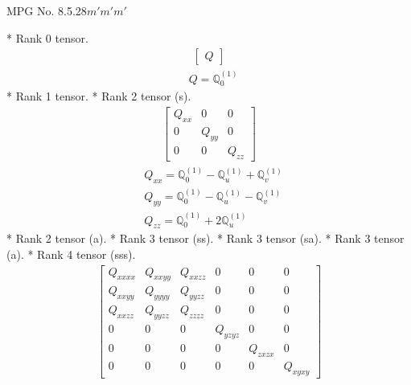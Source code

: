 \documentclass[fleqn,8pt,landscape]{jsarticle}
\begin{document}
\setcounter{MaxMatrixCols}{32}

\renewcommand{\tablename}{Table~}
\renewcommand{\figurename}{Figure~}
\begin{center}
\LARGE
MPG No. 8.5.28\quad$m'm'm'$
\end{center}
* Rank 0 tensor.
\begin{align*}
\begin{bmatrix} Q \end{bmatrix}
\end{align*}
\begin{align*}
& Q = \mathbb{Q}_{0}^{(1)}
\end{align*}
* Rank 1 tensor.
* Rank 2 tensor (s).
\begin{align*}
\begin{bmatrix} Q_{xx} & 0 & 0 \\ 0 & Q_{yy} & 0 \\ 0 & 0 & Q_{zz} \end{bmatrix}
\end{align*}
\begin{align*}
& Q_{xx} = \mathbb{Q}_{0}^{(1)} - \mathbb{Q}_{u}^{(1)} + \mathbb{Q}_{v}^{(1)} \\
& Q_{yy} = \mathbb{Q}_{0}^{(1)} - \mathbb{Q}_{u}^{(1)} - \mathbb{Q}_{v}^{(1)} \\
& Q_{zz} = \mathbb{Q}_{0}^{(1)} + 2 \mathbb{Q}_{u}^{(1)}
\end{align*}
* Rank 2 tensor (a).
* Rank 3 tensor (ss).
* Rank 3 tensor (sa).
* Rank 3 tensor (a).
* Rank 4 tensor (sss).
\begin{align*}
\begin{bmatrix} Q_{xxxx} & Q_{xxyy} & Q_{xxzz} & 0 & 0 & 0 \\ Q_{xxyy} & Q_{yyyy} & Q_{yyzz} & 0 & 0 & 0 \\ Q_{xxzz} & Q_{yyzz} & Q_{zzzz} & 0 & 0 & 0 \\ 0 & 0 & 0 & Q_{yzyz} & 0 & 0 \\ 0 & 0 & 0 & 0 & Q_{zxzx} & 0 \\ 0 & 0 & 0 & 0 & 0 & Q_{xyxy} \end{bmatrix}
\end{align*}
\end{document}
